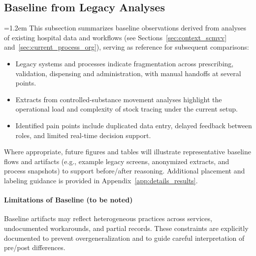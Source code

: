 \subsection{Baseline from Legacy Analyses}
\begingroup\emergencystretch=1.2em
This subsection summarizes baseline observations derived from analyses of existing hospital data and workflows (see Sections~\ref{sec:context_scmvv} and~\ref{sec:current_process_org}), serving as reference for subsequent comparisons:
\begin{itemize}
    \item Legacy systems and processes indicate fragmentation across prescribing, validation, dispensing and administration, with manual handoffs at several points.
    \item Extracts from controlled-substance movement analyses highlight the operational load and complexity of stock tracing under the current setup.
    \item Identified pain points include duplicated data entry, delayed feedback between roles, and limited real-time decision support.
\end{itemize}
Where appropriate, future figures and tables will illustrate representative baseline flows and artifacts (e.g., example legacy screens, anonymized extracts, and process snapshots) to support before/after reasoning.
Additional placement and labeling guidance is provided in Appendix~\ref{app:details_results}.
\endgroup

\paragraph{Limitations of Baseline (to be noted)}
Baseline artifacts may reflect heterogeneous practices across services, undocumented workarounds, and partial records. These constraints are explicitly documented to prevent overgeneralization and to guide careful interpretation of pre/post differences.

